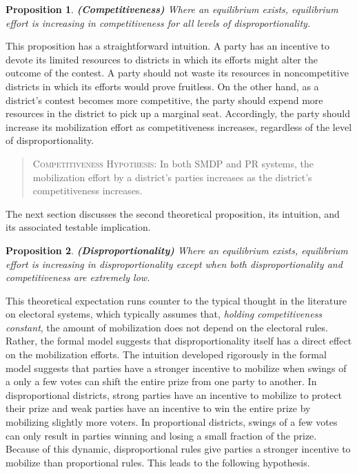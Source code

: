 \documentclass[12pt]{article}
\newtheorem{proposition}{Proposition}
\begin{document}
\begin{proposition}
\textbf{(Competitiveness)} Where an equilibrium exists, equilibrium effort is increasing in competitiveness for all levels of disproportionality.

\end{proposition}
This proposition has a straightforward intuition. A party has an incentive to devote its limited resources to districts in which its efforts might alter the outcome of the contest. A party should not waste its resources in noncompetitive districts in which its efforts would prove fruitless. On the other hand, as a district's contest becomes more competitive, the party should expend more resources in the district to pick up a marginal seat. Accordingly, the party should increase its mobilization effort as competitiveness increases, regardless of the level of disproportionality. 

\begin{quote}
\textsc{Competitiveness Hypothesis}: In both SMDP and PR systems, the mobilization effort by a district's parties increases as the district's competitiveness increases.
\end{quote}

The next section discusses the second theoretical proposition, its intuition, and its associated testable implication.

\begin{proposition}
\textbf{(Disproportionality)} Where an equilibrium exists, equilibrium effort is increasing in disproportionality except when both disproportionality and competitiveness are extremely low.

\end{proposition}

\noindent This theoretical expectation runs counter to the typical thought in the literature on electoral systems, which typically assumes that, \textit{holding competitiveness constant}, the amount of mobilization does not depend on the electoral rules. Rather, the formal model suggests that disproportionality itself has a direct effect on the mobilization efforts. The intuition developed rigorously in the formal model suggests that parties have a stronger incentive to mobilize when swings of a only a few votes can shift the entire prize from one party to another. In disproportional districts, strong parties have an incentive to mobilize to protect their prize and weak parties have an incentive to win the entire prize by mobilizing slightly more voters. In proportional districts, swings of a few votes can only result in parties winning and losing a small fraction of the prize. Because of this dynamic, disproportional rules give parties a stronger incentive to mobilize than proportional rules. This leads to the following hypothesis.
\end{document}
